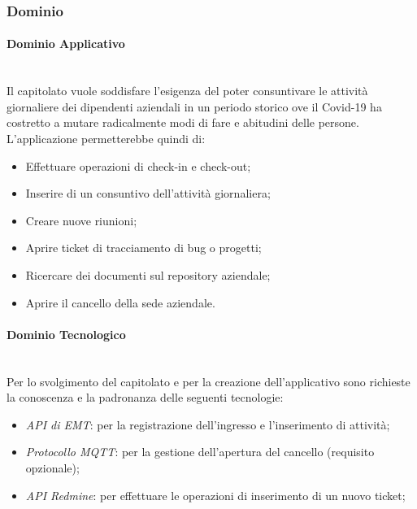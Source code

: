 \documentclass[11pt]{article}
\begin{document}
    \subsubsection{Dominio}
        \paragraph{Dominio Applicativo}~\\

		\noindent
        Il capitolato vuole soddisfare l'esigenza del poter consuntivare le attività giornaliere dei dipendenti aziendali in un
        periodo storico ove il Covid-19 ha costretto a mutare radicalmente modi di fare e abitudini delle persone.
        L'applicazione permetterebbe quindi di:
		\begin{itemize}
			\item Effettuare operazioni di check-in e check-out;
			\item Inserire di un consuntivo dell'attività giornaliera;
			\item Creare nuove riunioni;
			\item Aprire ticket di tracciamento di bug o progetti;
			\item Ricercare dei documenti sul repository aziendale;
			\item Aprire il cancello della sede aziendale.			
		\end{itemize}		        
		
        \paragraph{Dominio Tecnologico}~\\
        
        \noindent
        Per lo svolgimento del capitolato e per la creazione dell'applicativo sono richieste la conoscenza e la padronanza
        delle seguenti tecnologie:
        \begin{itemize}
            \item \textit{API di EMT}: per la registrazione dell'ingresso e l'inserimento di attività;
            \item \textit{Protocollo MQTT}: per la gestione dell'apertura del cancello (requisito opzionale);
            \item \textit{API Redmine}: per effettuare le operazioni di inserimento di un nuovo ticket;
        \end{itemize}
    
\end{document}
